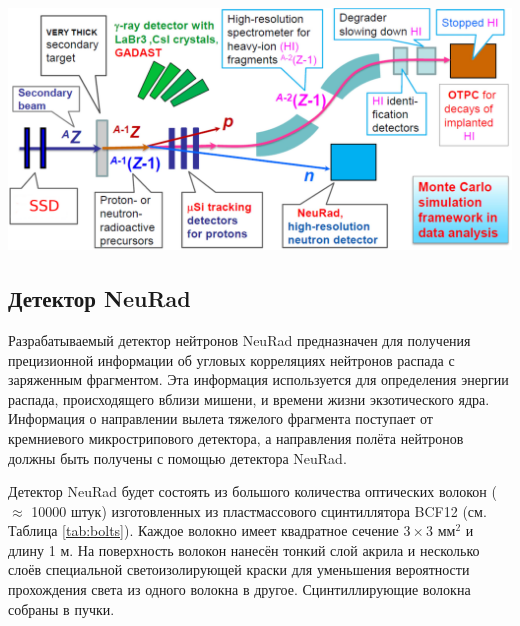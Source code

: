 {
	\centering
	\includegraphics[width=1\linewidth]{expert.png}
	\label{ris:expert}
}


\subsection{Детектор NeuRad}
Разрабатываемый детектор нейтронов NeuRad предназначен для получения прецизионной информации об угловых корреляциях нейтронов распада с заряженным фрагментом. Эта информация используется для определения энергии распада, происходящего вблизи мишени, и времени жизни экзотического ядра. Информация о направлении вылета тяжелого фрагмента поступает от кремниевого микрострипового детектора, а направления полёта нейтронов должны быть получены с помощью детектора NeuRad. 

Детектор NeuRad будет состоять из большого количества оптических волокон ($\approx$ 10000 штук) изготовленных из пластмассового сцинтиллятора BCF12 (см. Таблица \ref{tab:bolts}). Каждое волокно имеет квадратное сечение $3\times3$ мм$^2$ и длину 1 м. На поверхность волокон нанесён тонкий слой акрила и несколько слоёв специальной светоизолирующей краски для уменьшения вероятности прохождения света из одного волокна в другое. Сцинтиллирующие волокна собраны в пучки.

